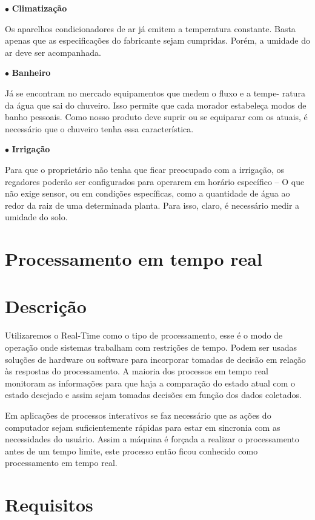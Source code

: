 $\bullet$ \textbf{Climatização}

	Os aparelhos condicionadores de ar já emitem a temperatura constante. Basta apenas que as especificações do fabricante sejam cumpridas. Porém, a umidade do ar deve ser acompanhada.

$\bullet$ \textbf{Banheiro}
	
	Já se encontram no mercado equipamentos que medem o fluxo e a tempe- ratura da água que sai do chuveiro. Isso permite que cada morador estabeleça modos de banho pessoais. Como nosso produto deve suprir ou se equiparar com
os atuais, é necessário que o chuveiro tenha essa característica.

$\bullet$ \textbf{Irrigação}

	Para que o proprietário não tenha que ficar preocupado com a irrigação, os regadores poderão ser configurados para operarem em horário específico – O que não exige sensor, ou em condições específicas, como a quantidade de água ao redor da raiz de uma determinada planta. Para isso, claro, é necessário medir a umidade do solo.


\section{Processamento em tempo real}

\section{Descrição}

	Utilizaremos o Real-Time como o tipo de processamento, esse é o modo de operação onde sistemas trabalham com restrições de tempo. Podem ser usadas soluções de hardware ou software para incorporar tomadas de decisão em relação às respostas do processamento. A maioria dos processos em tempo real monitoram as informações para que haja a comparação do estado atual com o estado desejado e assim sejam tomadas decisões em função dos dados coletados. 

	Em aplicações de processos interativos se faz necessário que as ações do computador sejam suficientemente rápidas para estar em sincronia com as necessidades do usuário. Assim a máquina é forçada a realizar o processamento antes de um tempo limite, este processo então ficou conhecido como processamento em tempo real.

\section{Requisitos}

